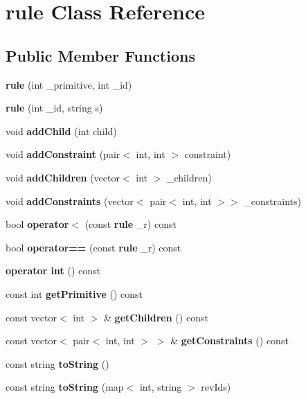 \section{rule Class Reference}
\label{classrule}
\subsection*{Public Member Functions}
\begin{DoxyCompactItemize}
\item 
\mbox{\label{classrule_a57401587d56ba2964054d93c83b4fc91}} 
{\bfseries rule} (int \+\_\+primitive, int \+\_\+id)
\item 
\mbox{\label{classrule_a16818e659188b4f1178c0b79db6bad9e}} 
{\bfseries rule} (int \+\_\+id, string s)
\item 
\mbox{\label{classrule_a683407785d4a437670d3750de5a9443d}} 
void {\bfseries add\+Child} (int child)
\item 
\mbox{\label{classrule_a5a32df9cc88c5738753f5dab97ef0c78}} 
void {\bfseries add\+Constraint} (pair$<$ int, int $>$ constraint)
\item 
\mbox{\label{classrule_a254d66c82aa990b8aefbf1f455da4b54}} 
void {\bfseries add\+Children} (vector$<$ int $>$ \+\_\+children)
\item 
\mbox{\label{classrule_afc2f02214950cd290b778c7cdeed1dce}} 
void {\bfseries add\+Constraints} (vector$<$ pair$<$ int, int $>$$>$ \+\_\+constraints)
\item 
\mbox{\label{classrule_aa565618df29091d61d9c99dcae908c38}} 
bool {\bfseries operator$<$} (const \textbf{ rule} \+\_\+r) const
\item 
\mbox{\label{classrule_ad88299597acd5c12937f762887cc3123}} 
bool {\bfseries operator==} (const \textbf{ rule} \+\_\+r) const
\item 
\mbox{\label{classrule_a3583aea5924ca47331105829e7277c51}} 
{\bfseries operator int} () const
\item 
\mbox{\label{classrule_a69402285132b8065910c3a8e66c92ca0}} 
const int {\bfseries get\+Primitive} () const
\item 
\mbox{\label{classrule_a1affa4ca1a9b2d60e9b1e2ebd80af839}} 
const vector$<$ int $>$ \& {\bfseries get\+Children} () const
\item 
\mbox{\label{classrule_a0320b0278bbedf43ea858e5f4531cdc6}} 
const vector$<$ pair$<$ int, int $>$ $>$ \& {\bfseries get\+Constraints} () const
\item 
\mbox{\label{classrule_a7f67e512d14d0fb95d55dd819ec6a1cd}} 
const string {\bfseries to\+String} ()
\item 
\mbox{\label{classrule_ab13ae3fc714c9706d14ffdbcff0d2ccb}} 
const string {\bfseries to\+String} (map$<$ int, string $>$ rev\+Ids)
\end{DoxyCompactItemize}
